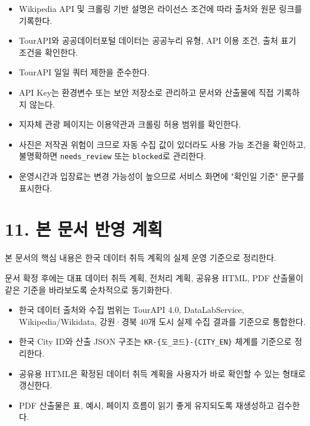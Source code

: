 \documentclass[12pt,a4paper]{article}
\newcommand{\DocNeedspace}[1]{\par\ifdim\dimexpr\pagegoal-\pagetotal\relax<#1\newpage\fi}
\newcommand{\TocNoChildTight}{\vspace{-0.28em}}
\begin{document}
\begin{itemize}
\item Wikipedia API 및 크롤링 기반 설명은 라이선스 조건에 따라 출처와 원문 링크를 기록한다.
\item TourAPI와 공공데이터포털 데이터는 공공누리 유형, API 이용 조건, 출처 표기 조건을 확인한다.
\item TourAPI 일일 쿼터 제한을 준수한다.
\item API Key는 환경변수 또는 보안 저장소로 관리하고 문서와 산출물에 직접 기록하지 않는다.
\item 지자체 관광 페이지는 이용약관과 크롤링 허용 범위를 확인한다.
\item 사진은 저작권 위험이 크므로 자동 수집 값이 있더라도 사용 가능 조건을 확인하고, 불명확하면 \texttt{needs\_\allowbreak{}review} 또는 \texttt{blocked}로 관리한다.
\item 운영시간과 입장료는 변경 가능성이 높으므로 서비스 화면에 "확인일 기준" 문구를 표시한다.
\end{itemize}


\newpage

\DocNeedspace{10\baselineskip}
\section*{11. 본 문서 반영 계획}
\addtocontents{toc}{\protect\TocNoChildTight}


\DocNeedspace{3\baselineskip}
본 문서의 핵심 내용은 한국 데이터 취득 계획의 실제 운영 기준으로 정리한다.

\DocNeedspace{3\baselineskip}
문서 확정 후에는 대표 데이터 취득 계획, 전처리 계획, 공유용 HTML, PDF 산출물이 같은 기준을 바라보도록 순차적으로 동기화한다.


\begin{itemize}
\item 한국 데이터 출처와 수집 범위는 TourAPI 4.0, DataLabService, Wikipedia/Wikidata, 강원·경북 40개 도시 실제 수집 결과를 기준으로 통합한다.
\item 한국 City ID와 산출 JSON 구조는 \texttt{KR-\allowbreak{}\{\allowbreak{}도\_\allowbreak{}코드\allowbreak{}\}-\allowbreak{}\{\allowbreak{}CITY\_\allowbreak{}EN\allowbreak{}\}} 체계를 기준으로 정리한다.
\item 공유용 HTML은 확정된 데이터 취득 계획을 사용자가 바로 확인할 수 있는 형태로 갱신한다.
\item PDF 산출물은 표, 예시, 페이지 흐름이 읽기 좋게 유지되도록 재생성하고 검수한다.
\end{itemize}
\end{document}
